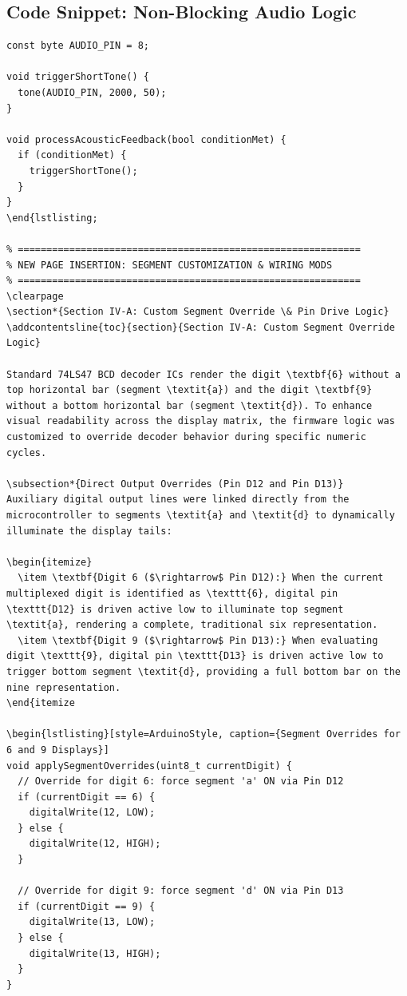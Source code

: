 \documentclass[12pt,letterpaper]{article}
\begin{document}
\subsection{Code Snippet: Non-Blocking Audio Logic}
\begin{lstlisting}[style=ArduinoStyle, caption={Asynchronous buzzer handler implementation}]
const byte AUDIO_PIN = 8;

void triggerShortTone() {
  tone(AUDIO_PIN, 2000, 50);
}

void processAcousticFeedback(bool conditionMet) {
  if (conditionMet) {
    triggerShortTone();
  }
}
\end{lstlisting;

% ============================================================
% NEW PAGE INSERTION: SEGMENT CUSTOMIZATION & WIRING MODS
% ============================================================
\clearpage
\section*{Section IV-A: Custom Segment Override \& Pin Drive Logic}
\addcontentsline{toc}{section}{Section IV-A: Custom Segment Override Logic}

Standard 74LS47 BCD decoder ICs render the digit \textbf{6} without a top horizontal bar (segment \textit{a}) and the digit \textbf{9} without a bottom horizontal bar (segment \textit{d}). To enhance visual readability across the display matrix, the firmware logic was customized to override decoder behavior during specific numeric cycles.

\subsection*{Direct Output Overrides (Pin D12 and Pin D13)}
Auxiliary digital output lines were linked directly from the microcontroller to segments \textit{a} and \textit{d} to dynamically illuminate the display tails:

\begin{itemize}
  \item \textbf{Digit 6 ($\rightarrow$ Pin D12):} When the current multiplexed digit is identified as \texttt{6}, digital pin \texttt{D12} is driven active low to illuminate top segment \textit{a}, rendering a complete, traditional six representation.
  \item \textbf{Digit 9 ($\rightarrow$ Pin D13):} When evaluating digit \texttt{9}, digital pin \texttt{D13} is driven active low to trigger bottom segment \textit{d}, providing a full bottom bar on the nine representation.
\end{itemize

\begin{lstlisting}[style=ArduinoStyle, caption={Segment Overrides for 6 and 9 Displays}]
void applySegmentOverrides(uint8_t currentDigit) {
  // Override for digit 6: force segment 'a' ON via Pin D12
  if (currentDigit == 6) {
    digitalWrite(12, LOW); 
  } else {
    digitalWrite(12, HIGH);
  }

  // Override for digit 9: force segment 'd' ON via Pin D13
  if (currentDigit == 9) {
    digitalWrite(13, LOW);
  } else {
    digitalWrite(13, HIGH);
  }
}
\end{lstlisting}
\end{document}
